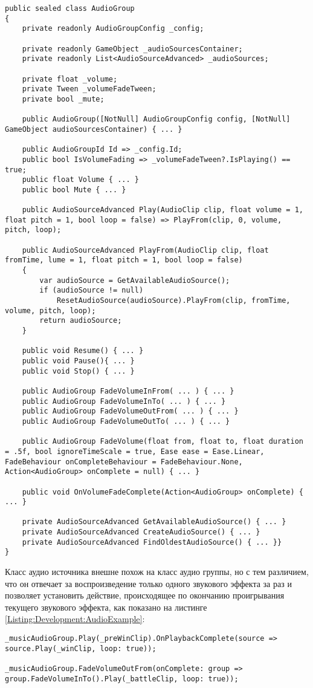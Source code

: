 \begin{lstlisting}[caption={Класс аудио группы}, label=Listing:Development:AudioGroup]
public sealed class AudioGroup
{
    private readonly AudioGroupConfig _config;

    private readonly GameObject _audioSourcesContainer;
    private readonly List<AudioSourceAdvanced> _audioSources;

    private float _volume;
    private Tween _volumeFadeTween;
    private bool _mute;

    public AudioGroup([NotNull] AudioGroupConfig config, [NotNull] GameObject audioSourcesContainer) { ... }

    public AudioGroupId Id => _config.Id;
    public bool IsVolumeFading => _volumeFadeTween?.IsPlaying() == true;
    public float Volume { ... }
    public bool Mute { ... }

    public AudioSourceAdvanced Play(AudioClip clip, float volume = 1, float pitch = 1, bool loop = false) => PlayFrom(clip, 0, volume, pitch, loop);

    public AudioSourceAdvanced PlayFrom(AudioClip clip, float fromTime, lume = 1, float pitch = 1, bool loop = false)
    {
        var audioSource = GetAvailableAudioSource();
        if (audioSource != null)
            ResetAudioSource(audioSource).PlayFrom(clip, fromTime, volume, pitch, loop);
        return audioSource;
    }

    public void Resume() { ... }
    public void Pause(){ ... }
    public void Stop() { ... }

    public AudioGroup FadeVolumeInFrom( ... ) { ... }
    public AudioGroup FadeVolumeInTo( ... ) { ... }
    public AudioGroup FadeVolumeOutFrom( ... ) { ... }
    public AudioGroup FadeVolumeOutTo( ... ) { ... }

    public AudioGroup FadeVolume(float from, float to, float duration = .5f, bool ignoreTimeScale = true, Ease ease = Ease.Linear, FadeBehaviour onCompleteBehaviour = FadeBehaviour.None, Action<AudioGroup> onComplete = null) { ... }

    public void OnVolumeFadeComplete(Action<AudioGroup> onComplete) { ... }

    private AudioSourceAdvanced GetAvailableAudioSource() { ... }
    private AudioSourceAdvanced CreateAudioSource() { ... }
    private AudioSourceAdvanced FindOldestAudioSource() { ... }}
}
\end{lstlisting}

Класс аудио источника внешне похож на класс аудио группы, но с тем различием, что он отвечает за воспроизведение только одного звукового эффекта за раз и позволяет установить действие, происходящее по окончанию проигрывания текущего звукового эффекта, как показано на листинге \ref{Listing:Development:AudioExample}:

\begin{lstlisting}[caption={Пример использования аудио системы}, label=Listing:Development:AudioExample]
_musicAudioGroup.Play(_preWinClip).OnPlaybackComplete(source => source.Play(_winClip, loop: true));

_musicAudioGroup.FadeVolumeOutFrom(onComplete: group => group.FadeVolumeInTo().Play(_battleClip, loop: true));
\end{lstlisting}